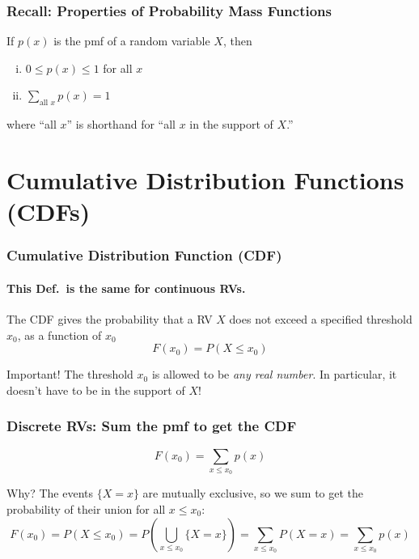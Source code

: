 \def\RVraw{(-2.5,0) circle [radius=1.7]
	(-2.5,0) circle [radius=1.7]
	(2.5,0) circle [radius=1.7]
	node [above left] at (-3.75,1.25) {$S$}
	node [above right] at (3.75,1.25) {$\mathbb{R}$}
	node [above] at (0,2) {$X\colon S \mapsto \mathbb{R}$}}
\begin{frame}
\frametitle{Recall: Properties of Probability Mass Functions}

If $p(x)$ is the pmf of a random variable $X$, then
\begin{enumerate}[(i)]
	\item $0\leq p(x) \leq 1$ for all $x$ \vspace{1em}
	\item $\displaystyle \sum_{\mbox{all } x} p(x) = 1$
\end{enumerate}

\vspace{0.75em}
where ``all $x$'' is shorthand for ``all $x$ in the support of $X$.''
\end{frame}
\section{Cumulative Distribution Functions (CDFs)}

\begin{frame}
\frametitle{Cumulative Distribution Function (CDF)}
\framesubtitle{This Def.\ is \alert{the same} for continuous RVs.}

The CDF gives the probability that a RV $X$ \alert{does not exceed} a specified threshold $x_0$, as a function of $x_0$
	$$F(x_0) = P(X \leq x_0)$$

\begin{alertblock}{Important!}
The threshold $x_0$ is allowed to be \emph{any real number}. In particular, it doesn't have to be in the support of $X$! 
\end{alertblock}

\end{frame}
\begin{frame}
\frametitle{Discrete RVs: Sum the pmf to get the CDF}
\begin{center}
	\alert{$$\boxed{F(x_0) = \sum_{x\leq x_0} p(x)}$$}
\end{center}

\small
 
\begin{block}{Why?}
The events $\{X = x\}$ are mutually exclusive, so we sum to get the probability of their union for all $x\leq x_0$:
	$$F(x_0) = P(X \leq x_0)=   P\left(\bigcup_{x\leq x_0}\{X = x\}\right) =   \sum_{x \leq x_0} P(X = x) =   \sum_{x \leq x_0} p(x)$$
\end{block}

\end{frame}


